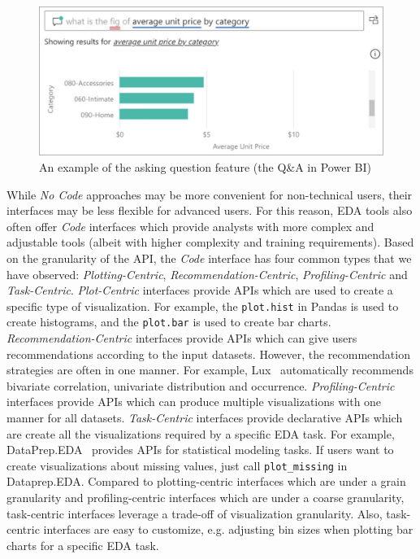 \documentclass[11pt]{article}
\newcommand{\stitle}[1]{ \noindent{\bf #1.\xspace}}
\begin{document}
\begin{figure}[t]
    \centering
    \includegraphics[width=.8\textwidth]{figs/ask-question.pdf}
    \caption{An example of the asking question feature (the Q\&A in Power BI)}
    \label{fig:ask-question}
\end{figure}


\stitle{Code}
While \emph{No Code} approaches may be more convenient for non-technical users, their interfaces may be less flexible for advanced users. For this reason, EDA tools also often offer \emph{Code} interfaces which provide analysts with more complex and adjustable tools (albeit with higher complexity and training requirements). Based on the granularity of the API, the \emph{Code} interface has four common types that we have observed: \emph{Plotting-Centric}, \emph{Recommendation-Centric}, \emph{Profiling-Centric} and \emph{Task-Centric}. \emph{Plot-Centric} interfaces provide APIs which are used to create a specific type of visualization. For example, the \texttt{plot.hist} in Pandas is used to create histograms, and the \texttt{plot.bar} is used to create bar charts. \emph{Recommendation-Centric} interfaces provide APIs which can give users recommendations according to the input datasets. However, the recommendation strategies are often in one manner. For example, Lux~\cite{DBLP:journals/pvldb/LeeTABCKMSYHP21} automatically recommends bivariate correlation, univariate distribution and occurrence. \emph{Profiling-Centric} interfaces provide APIs which can produce multiple visualizations with one manner for all datasets. \emph{Task-Centric} interfaces provide declarative APIs which are create all the visualizations required by a specific EDA task. For example, DataPrep.EDA~\cite{DBLP:conf/sigmod/PengWLBYXCRW21} provides APIs for statistical modeling tasks. If users want to create visualizations about missing values, just call \texttt{plot\_missing} in Dataprep.EDA. Compared to plotting-centric interfaces which are under a grain granularity and profiling-centric interfaces which are under a coarse granularity, task-centric interfaces leverage a trade-off of visualization granularity. Also, task-centric interfaces are easy to customize, e.g. adjusting bin sizes when plotting bar charts for a specific EDA task.
\end{document}
